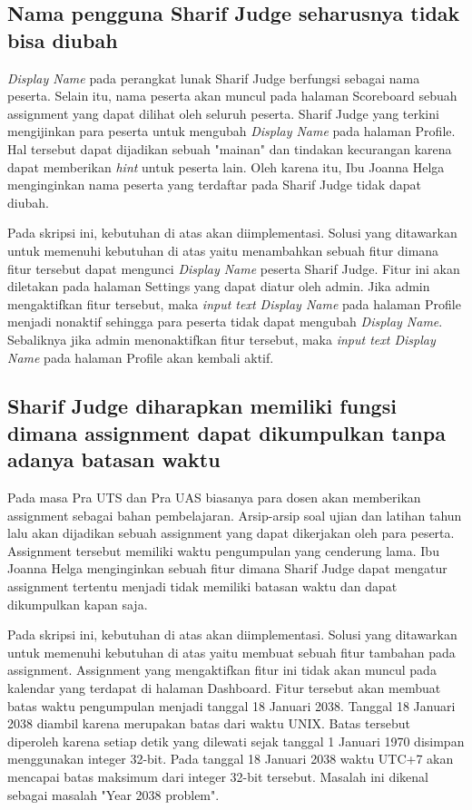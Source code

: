 \subsection{Nama pengguna Sharif Judge seharusnya tidak bisa diubah}
\textit{Display Name} pada perangkat lunak Sharif Judge berfungsi sebagai nama peserta. Selain itu, nama peserta akan muncul pada halaman Scoreboard sebuah assignment yang dapat dilihat oleh seluruh peserta. Sharif Judge yang terkini mengijinkan para peserta untuk mengubah \textit{Display Name} pada halaman Profile. Hal tersebut dapat dijadikan sebuah "mainan" dan tindakan kecurangan karena dapat memberikan \textit{hint} untuk peserta lain. Oleh karena itu, Ibu Joanna Helga menginginkan nama peserta yang terdaftar pada Sharif Judge tidak dapat diubah. 

Pada skripsi ini, kebutuhan di atas akan diimplementasi. Solusi yang ditawarkan untuk memenuhi kebutuhan di atas yaitu menambahkan sebuah fitur dimana fitur tersebut dapat mengunci \textit{Display Name} peserta Sharif Judge. Fitur ini akan diletakan pada halaman Settings yang dapat diatur oleh admin. Jika admin mengaktifkan fitur tersebut, maka \textit{input text Display Name} pada halaman Profile menjadi nonaktif sehingga para peserta tidak dapat mengubah \textit{Display Name}. Sebaliknya jika admin menonaktifkan fitur tersebut, maka \textit{input text Display Name} pada halaman Profile akan kembali aktif.

\subsection{Sharif Judge diharapkan memiliki fungsi dimana assignment dapat dikumpulkan tanpa adanya batasan waktu}
Pada masa Pra UTS dan Pra UAS biasanya para dosen akan memberikan assignment sebagai bahan pembelajaran. Arsip-arsip soal ujian dan latihan tahun lalu akan dijadikan sebuah assignment yang dapat dikerjakan oleh para peserta. Assignment tersebut memiliki waktu pengumpulan yang cenderung lama. Ibu Joanna Helga menginginkan sebuah fitur dimana Sharif Judge dapat mengatur assignment tertentu menjadi tidak memiliki batasan waktu dan dapat dikumpulkan kapan saja. 

Pada skripsi ini, kebutuhan di atas akan diimplementasi. Solusi yang ditawarkan untuk memenuhi kebutuhan di atas yaitu membuat sebuah fitur tambahan pada assignment. Assignment yang mengaktifkan fitur ini tidak akan muncul pada kalendar yang terdapat di halaman Dashboard. Fitur tersebut akan membuat batas waktu pengumpulan menjadi tanggal 18 Januari 2038. Tanggal 18 Januari 2038 diambil karena merupakan batas dari waktu UNIX. Batas tersebut diperoleh karena setiap detik yang dilewati sejak tanggal 1 Januari 1970 disimpan menggunakan integer 32-bit. Pada tanggal 18 Januari 2038 waktu UTC+7 akan mencapai batas maksimum dari integer 32-bit tersebut. Masalah ini dikenal sebagai masalah "Year 2038 problem". 

